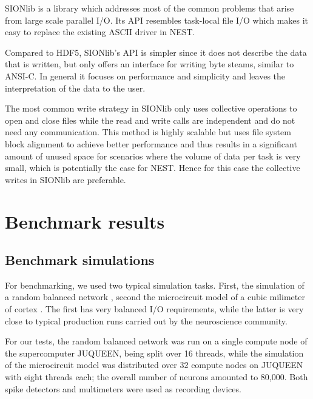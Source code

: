 \documentclass[]{YIC2015}
\begin{document}
SIONlib \cite{frings2009scalable} is a library which addresses most of
the common problems that arise from large scale parallel I/O. Its API
resembles task-local file I/O which makes it easy to replace the
existing ASCII driver in NEST.

Compared to HDF5, SIONlib's API is simpler since it does not describe
the data that is written, but only offers an interface for writing
byte steams, similar to ANSI-C. In general it focuses on performance
and simplicity and leaves the interpretation of the data to the user.

The most common write strategy in SIONlib only uses collective
operations to open and close files while the read and write calls are
independent and do not need any communication. This method is highly
scalable but uses file system block alignment to achieve better
performance and thus results in a significant amount of unused space
for scenarios where the volume of data per task is very small, which
is potentially the case for NEST. Hence for this case the collective
writes in SIONlib are preferable.

\section{Benchmark results}


\subsection{Benchmark simulations}

For benchmarking, we used two typical simulation tasks. First, the
simulation of a random balanced network \cite{morrison07}, second the
microcircuit model of a cubic milimeter of cortex \cite{potjans14}.
The first has very balanced I/O requirements, while the latter is very
close to typical production runs carried out by the neuroscience
community.

For our tests, the random balanced network was run on a single compute
node of the supercomputer JUQUEEN, being split over 16 threads, while
the simulation of the microcircuit model was distributed over 32
compute nodes on JUQUEEN with eight threads each; the overall number
of neurons amounted to 80,000. Both spike detectors and multimeters
were used as recording devices.
\end{document}
